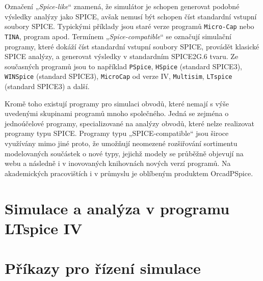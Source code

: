 {    Označení „\emph{Spice-like}“ znamená, že simulátor je schopen generovat podobné výsledky 
    analýzy jako SPICE, avšak nemusí být schopen číst standardní vstupní soubory SPICE. Typickými 
    příklady jsou staré verze programů \texttt{Micro-Cap} nebo \texttt{TINA}, program apod. Termínem
    „\emph{Spice-compatible}“ se označují simulační programy, které dokáží číst standardní vstupní 
    soubory SPICE, provádět klasické SPICE analýzy, a generovat výsledky v standardním SPICE2G.6 
    tvaru. Ze současných programů jsou to například \texttt{PSpice}, \texttt{HSpice} (standard 
    SPICE3), \texttt{WINSpice} (standard SPICE3), \texttt{MicroCap} od verze IV, \texttt{Multisim}, 
    \texttt{LTspice} (standard SPICE3) a další.

    Kromě toho existují programy pro simulaci obvodů, které nemají s výše uvedenými skupinami 
    programů mnoho společného. Jedná se zejména o jednoúčelové programy, specializované na analýzy 
    obvodů, které nelze realizovat programy typu SPICE. Programy typu „SPICE-compatible“ jsou široce
    využívány mimo jiné proto, že umožňují neomezené rozšiřování sortimentu modelovaných součástek 
    o nové typy, jejichž modely se průběžně objevují na webu a následně i v inovovaných knihovnách 
    nových verzí programů. Na akademických pracovištích i v průmyslu je oblíbeným produktem
    OrcadPSpice.\cite[s.~10]{Biolek2}

  \section{Simulace a analýza v programu LTspice IV}
   
  \section{Příkazy pro řízení simulace}
    
}
